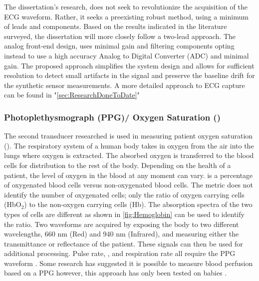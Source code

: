 The dissertation's research, does not seek to revolutionize the acquisition of the ECG waveform. Rather, it seeks a preexisting robust method, using a minimum of leads and components. Based on the results indicated in the literature surveyed, the dissertation will more closely follow a two-lead approach. The analog front-end design, uses minimal gain and filtering components opting instead to use a high accuracy Analog to Digital Converter (ADC) and minimal gain. The proposed approach simplifies the system design and allows for sufficient resolution to detect small artifacts in the signal and preserve the baseline drift for the synthetic sensor measurements. A more detailed approach to ECG capture can be found in "\cref{sec:ResearchDoneToDate}"



\subsubsection[Photoplethysmograph(PPG)]{Photoplethysmograph (PPG)/ Oxygen Saturation ()}
\label{subsubsec:Photoplethysmograph}
The second transducer researched is used in measuring patient oxygen saturation (). The respiratory system of a human body takes in oxygen from the air into the lungs where oxygen is extracted. The absorbed oxygen is transferred to the blood cells for distribution to the rest of the body. Depending on the health of a patient, the level of oxygen in the blood at any moment can vary.  is a percentage of oxygenated blood cells versus non-oxygenated blood cells. The  metric does not identify the number of oxygenated cells; only the ratio of oxygen carrying cells (HbO$_2$) to the non-oxygen carrying cells (Hb). The absorption spectra of the two types of cells are different as shown in \cref{fig:Hemoglobin}\cite{Prahl1998} can be used to identify the ratio. Two waveforms are acquired by exposing the body to two different wavelengths, 660 nm (Red) and 940 nm (Infrared), and measuring either the transmittance or reflectance of the patient. These signals can then be used for additional processing. Pulse rate, , and respiration rate all require the PPG waveform \cite{Scully2012} \cite{Kraitl2011}.  Some research has suggested it is possible to measure blood perfusion based on a PPG however, this approach has only been tested on babies \cite{Noor2011}.


